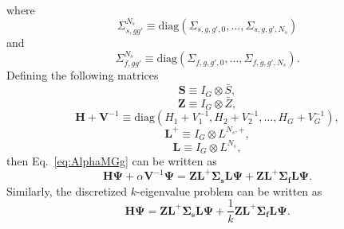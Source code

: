 where 
\begin{equation}
\Sigma_{s,gg'}^{N_{s}} \equiv \text{diag}(\Sigma_{s,g,g',0}, \dots, \Sigma_{s,g,g',N_{s}})
\end{equation}
and
\begin{equation}
\Sigma_{f,gg'}^{N_{s}} \equiv \text{diag}(\Sigma_{f,g,g',0}, \dots, \Sigma_{f,g,g',N_{s}}).
\end{equation}
Defining the following matrices 
\begin{equation}
\mathbf{S} \equiv I_{G} \otimes \bar{S},
\end{equation} 
\begin{equation}
\mathbf{Z} \equiv I_{G} \otimes \bar{Z},
\end{equation}
\begin{equation}
\mathbf{H} + \mathbf{V}^{-1} \equiv \text{diag}(H_{1} + V^{-1}_{1}, H_{2} + V^{-1}_{2}, \dots, H_{G} + V^{-1}_{G}),
\end{equation}
\begin{equation}
\mathbf{L}^{+} \equiv I_{G} \otimes L^{N_{s},+},
\end{equation}
\begin{equation}
\mathbf{L} \equiv I_{G} \otimes L^{N_{s}},
\end{equation} 
then Eq.~\ref{eq:AlphaMGg} can be written as
\begin{equation}
	\mathbf{H}\mathbf{\Psi} + \alpha \mathbf{V}^{-1}\mathbf{\Psi} = \mathbf{Z} \mathbf{L}^{+}  \mathbf{\Sigma_{s}} \mathbf{L} \mathbf{\Psi} + \mathbf{Z} \mathbf{L}^{+}  \mathbf{\Sigma_{f}} \mathbf{L} \mathbf{\Psi}.
	\label{AlphaMG}
\end{equation}
Similarly, the discretized $k$-eigenvalue problem can be written as
\begin{equation}
	\mathbf{H}\mathbf{\Psi}  = \mathbf{Z} \mathbf{L}^{+}  \mathbf{\Sigma_{s}} \mathbf{L} \mathbf{\Psi} + \frac{1}{k}\mathbf{Z} \mathbf{L}^{+}  \mathbf{\Sigma_{f}} \mathbf{L} \mathbf{\Psi}.
	\label{kMG}
\end{equation}